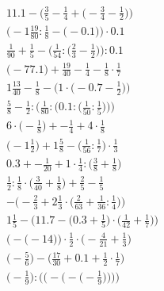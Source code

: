 \documentclass[8pt]{article}
\begin{document}
\begin{align}
11.1 - \Big(\frac{3}{5} - \frac{1}{4} + \big(-\frac{3}{4} - \frac{1}{2}\big)\Big) \\
\Big(-1\frac{19}{80} : \frac{1}{8} - \big(-0.1\big)\Big) \cdot 0.1 \\
\frac{1}{90} + \frac{1}{5} - \Big(\frac{1}{54} : \big(\frac{2}{3} - \frac{1}{2}\big)\Big) : 0.1 \\
\big(-77.1\big) + \frac{19}{40} - \frac{1}{4} - \frac{1}{8} \cdot \frac{1}{7} \\
1\frac{13}{40} - \frac{1}{8} - \Big(1 \cdot \big(-0.7 - \frac{1}{2}\big)\Big) \\
\frac{5}{8} - \frac{1}{2} : \bigg(\frac{1}{80} : \Big(0.1 : \big(\frac{1}{50} : \frac{1}{5}\big)\Big)\bigg) \\
6 \cdot \big(-\frac{1}{8}\big) + -\frac{1}{4} + 4 \cdot \frac{1}{8} \\
\big(-1\frac{1}{2}\big) + 1\frac{5}{8} - \big(\frac{1}{56} : \frac{1}{7}\big) \cdot \frac{1}{3} \\
0.3 + -\frac{1}{20} + 1 \cdot \frac{1}{4} : \big(\frac{3}{8} + \frac{1}{8}\big) \\
\frac{1}{2} : \frac{1}{8} \cdot \big(\frac{3}{40} + \frac{1}{8}\big) + \frac{2}{5} - \frac{1}{5} \\
-\Big(-\frac{2}{3} + 2\frac{1}{3} \cdot \big(\frac{2}{63} + \frac{1}{36} : \frac{1}{4}\big)\Big) \\
1\frac{1}{5} - \Big(11.7 - \big(0.3 + \frac{1}{5}\big) \cdot \big(\frac{1}{42} + \frac{1}{7}\big)\Big) \\
\Big(-\big(-14\big)\Big) \cdot \frac{1}{2} \cdot \Big(-\frac{4}{21} + \frac{1}{3}\Big) \\
\big(-\frac{5}{6}\big) - \big(\frac{17}{30} + 0.1 + \frac{1}{2} \cdot \frac{1}{7}\big) \\
\Bigg(-\frac{1}{9}\Bigg) : \Bigg(\bigg(-\Big(-\big(-\frac{1}{9}\big)\Big)\bigg)\Bigg)
\end{align}
\end{document}
